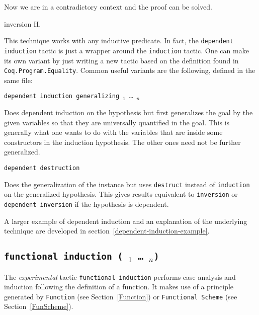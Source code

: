 \begin{coq_example*}
Now we are in a contradictory context and the proof can be solved.
\begin{coq_example}
inversion H.
\end{coq_example}

This technique works with any inductive predicate.
In fact, the \texttt{dependent induction} tactic is just a wrapper around
the \texttt{induction} tactic. One can make its own variant by just
writing a new tactic based on the definition found in
\texttt{Coq.Program.Equality}. Common useful variants are the following,
defined in the same file:

\begin{Variants}
\item {\tt dependent induction {\ident} generalizing {\ident$_1$} \dots
    {\ident$_n$}}

  Does dependent induction on the hypothesis {\ident} but first
  generalizes the goal by the given variables so that they are
  universally quantified in the goal. This is generally what one wants
  to do with the variables that are inside some constructors in the
  induction hypothesis. The other ones need not be further generalized.

\item {\tt dependent destruction {\ident}}

  Does the generalization of the instance {\ident} but uses {\tt destruct}
  instead of {\tt induction} on the generalized hypothesis. This gives
  results equivalent to {\tt inversion} or {\tt dependent inversion} if
  the hypothesis is dependent.
\end{Variants}

A larger example of dependent induction and an explanation of the
underlying technique are developed in section~\ref{dependent-induction-example}.

\subsection{\tt functional induction (\qualid\ \term$_1$ \dots\ \term$_n$)}
\label{FunInduction}

The \emph{experimental} tactic \texttt{functional induction} performs
case analysis and induction following the definition of a function. It
makes use of a principle generated by \texttt{Function}
(see Section~\ref{Function}) or \texttt{Functional Scheme}
(see Section~\ref{FunScheme}).


\end{coq_example*}
